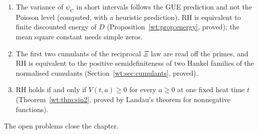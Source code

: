 \begin{enumerate}
\item The variance of $\psi_{\mathrm C}$ in short intervals follows the GUE prediction and not the Poisson level (computed, with a heuristic prediction). RH is equivalent to finite discounted energy of $D$ (Proposition~\ref{wt:prop:energy}, proved); the mean square constant needs simple zeros.
\item The first two cumulants of the reciprocal $\Xi$ law are read off the primes, and RH is equivalent to the positive semidefiniteness of two Hankel families of the normalised cumulants (Section~\ref{wt:sec:cumulants}, proved).
\item RH holds if and only if $V(t,a)\ge0$ for every $a\ge0$ at one fixed heat time $t$ (Theorem~\ref{wt:thm:sin2}, proved by Landau's theorem for nonnegative functions).
\end{enumerate}
The open problems close the chapter.
